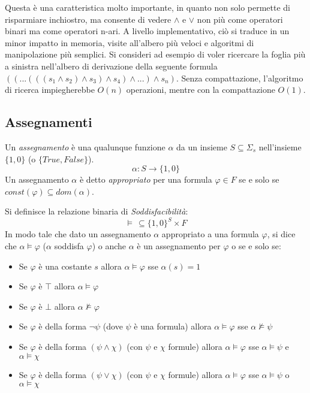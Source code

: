 \documentclass[./main.tex]{subfiles}
\begin{document}
Questa è una caratteristica molto importante, in quanto non solo permette di risparmiare inchiostro, ma consente di vedere
$\land$ e $\lor$ non più come operatori binari ma come operatori n-ari. A livello implementativo, ciò si traduce in un minor
impatto in memoria, visite all'albero più veloci e algoritmi di manipolazione più semplici. Si consideri ad esempio di voler ricercare la 
foglia più a sinistra nell'albero di derivazione della seguente formula $(( ... (((s_1 \land s_2) \land s_3) \land s_4) \land ... )\land s_n)$.
Senza compattazione, l'algoritmo di ricerca impiegherebbe $O(n)$ operazioni, mentre con la compattazione $O(1)$.




\subsection{Assegnamenti} \label{sec:assegnamenti}

Un \textit{assegnamento} è una qualunque funzione $\alpha$ da un 
insieme $S \subseteq \Sigma_s$ nell'insieme $\{1, 0\}$ (o $\{True, False\}$).
$$ \alpha : S \rightarrow \{1, 0\} $$
Un assegnamento $\alpha$ è detto \textit{appropriato}  per una formula $\varphi \in F$ se e solo se $const(\varphi) \subseteq dom(\alpha)$.

Si definisce la relazione binaria di \textit{Soddisfacibilità}: 
$$\models \, \subseteq \{1, 0\}^{S} \times F$$
In modo tale che dato un assegnamento $\alpha$ appropriato a una formula $\varphi$, si dice che $\alpha \models \varphi$ ($\alpha$ soddisfa $\varphi$) 
o anche $\alpha$ è un assegnamento per $\varphi$ o  se e solo se:

\begin{itemize}
  \item Se $\varphi$ è una costante $s$ allora $\alpha \models \varphi$ sse $\alpha(s) = 1$
  \item Se $\varphi$ è $\top$ allora $\alpha \models \varphi$
  \item Se $\varphi$ è $\bot$ allora $\alpha \not\models \varphi$
  \item Se $\varphi$ è della forma $\lnot \psi$ (dove $\psi$ è una formula) allora $\alpha \models \varphi$ sse $\alpha \not\models \psi$
  \item Se $\varphi$ è della forma $(\psi \land \chi)$ (con $\psi$ e $\chi$ formule) allora $\alpha \models \varphi$ sse $\alpha \models \psi$ e $\alpha \models \chi$
  \item Se $\varphi$ è della forma $(\psi \lor \chi)$ (con $\psi$ e $\chi$ formule) allora $\alpha \models \varphi$ sse $\alpha \models \psi$ o $\alpha \models \chi$
\end{itemize}
\end{document}
